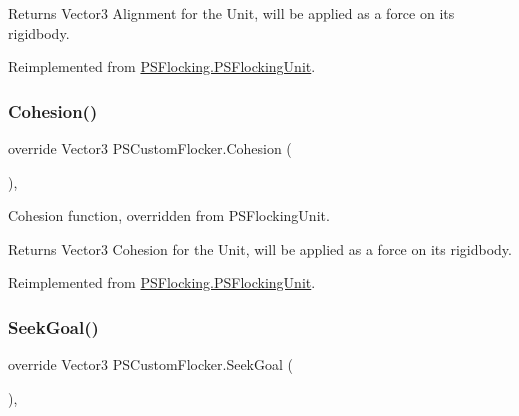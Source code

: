 \begin{DoxyReturn}{Returns}
Vector3 Alignment for the Unit, will be applied as a force on its rigidbody. 
\end{DoxyReturn}


Reimplemented from \hyperlink{class_p_s_flocking_1_1_p_s_flocking_unit_ada3fa9e23f12a1b8258dc324f5b3e511}{P\+S\+Flocking.\+P\+S\+Flocking\+Unit}.

\mbox{\label{class_p_s_custom_flocker_a46d7ff69872c12983a666293794b976f}} 
\subsubsection{\texorpdfstring{Cohesion()}{Cohesion()}}
{\footnotesize\ttfamily override Vector3 P\+S\+Custom\+Flocker.\+Cohesion (\begin{DoxyParamCaption}{ }\end{DoxyParamCaption})\hspace{0.3cm}{\ttfamily [protected]}, {\ttfamily [virtual]}}



Cohesion function, overridden from P\+S\+Flocking\+Unit. 

\begin{DoxyReturn}{Returns}
Vector3 Cohesion for the Unit, will be applied as a force on its rigidbody. 
\end{DoxyReturn}


Reimplemented from \hyperlink{class_p_s_flocking_1_1_p_s_flocking_unit_a87ad210603e8d8451e14a4de8af9cba0}{P\+S\+Flocking.\+P\+S\+Flocking\+Unit}.

\mbox{\label{class_p_s_custom_flocker_a43590dd2fdf5f37d2116cf08473375c7}} 
\subsubsection{\texorpdfstring{Seek\+Goal()}{SeekGoal()}}
{\footnotesize\ttfamily override Vector3 P\+S\+Custom\+Flocker.\+Seek\+Goal (\begin{DoxyParamCaption}{ }\end{DoxyParamCaption})\hspace{0.3cm}{\ttfamily [protected]}, {\ttfamily [virtual]}}



